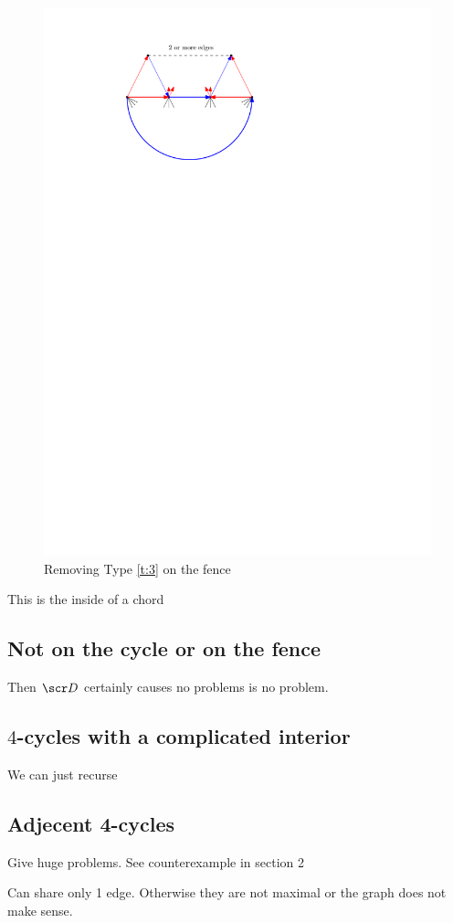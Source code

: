  \begin{figure}[h]
    \centering
    \includegraphics[scale=1]{4cycles/img/fence_d}
    \caption{Removing Type \ref{t:3} on the fence}
    \label{fig:4c:fence_d}
  \end{figure}



    This is the inside of a chord

\subsection{Not on the cycle or on the fence}
  Then $\D$ certainly causes no problems  is no problem.

\subsection{$4$-cycles with a complicated interior}
  We can just recurse

\subsection{Adjecent 4-cycles}
  Give huge problems. See counterexample in section 2

  Can share only 1 edge. Otherwise they are not maximal or the graph does not make sense.

